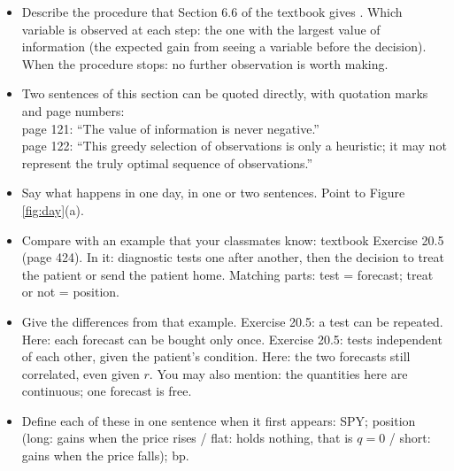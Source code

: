\documentclass{article}
\newenvironment{pts}{\begin{itemize}[nosep,leftmargin=1.15em,topsep=1pt]}{\end{itemize}}
\begin{document}
\begin{note}
\begin{pts}
\item Describe the procedure that Section 6.6 of the textbook gives \citep{kochenderfer2022algorithms}. Which variable is observed at each step: the one with the largest value of information (the expected gain from seeing a variable before the decision). When the procedure stops: no further observation is worth making.
\item Two sentences of this section can be quoted directly, with quotation marks and page numbers:\\
page 121: ``The value of information is never negative.''\\
page 122: ``This greedy selection of observations is only a heuristic; it may not represent the truly optimal sequence of observations.''
\end{pts}
\end{note}

\begin{note}
\begin{pts}
\item Say what happens in one day, in one or two sentences. Point to Figure \ref{fig:day}(a).
\item Compare with an example that your classmates know: textbook Exercise 20.5 (page 424). In it: diagnostic tests one after another, then the decision to treat the patient or send the patient home. Matching parts: test = forecast; treat or not = position.
\item Give the differences from that example. Exercise 20.5: a test can be repeated. Here: each forecast can be bought only once. Exercise 20.5: tests independent of each other, given the patient's condition. Here: the two forecasts still correlated, even given $r$. You may also mention: the quantities here are continuous; one forecast is free.
\item Define each of these in one sentence when it first appears: SPY; position (long: gains when the price rises / flat: holds nothing, that is $q=0$ / short: gains when the price falls); bp.
\end{pts}
\end{note}
\end{document}

